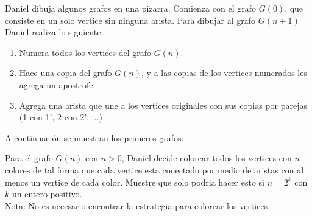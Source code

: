 \begin{problem}
    Daniel dibuja algunos grafos en una pizarra. Comienza con el grafo $G(0)$, que consiste en un solo vertice sin
    ninguna arista. Para dibujar al grafo $G(n+1)$ Daniel realiza lo siguiente:
    \begin{enumerate}
        \item Numera todos los vertices del grafo $G(n)$.
        \item Hace una copia del grafo $G(n)$, y a las copias de los vertices numerados les agrega un apostrofe.
        \item Agrega una arista que une a los vertices originales con sus copias por parejas (1 con 1', 2 con 2', $\ldots$)
    \end{enumerate}
    A continuaci\'on se muestran los primeros grafos:

    \begin{center}
    \end{center}
    
    Para el grafo $G(n)$ con $n>0$, Daniel decide colorear todos los vertices con $n$ colores de tal forma que cada 
    vertice esta conectado por medio de aristas con al menos un vertice de cada color. Muestre que solo podria hacer 
    esto si $n=2^k$ con $k$ un entero positivo. \\
    Nota: No es necesario encontrar la estrategia para colorear los vertices.
\end{problem}